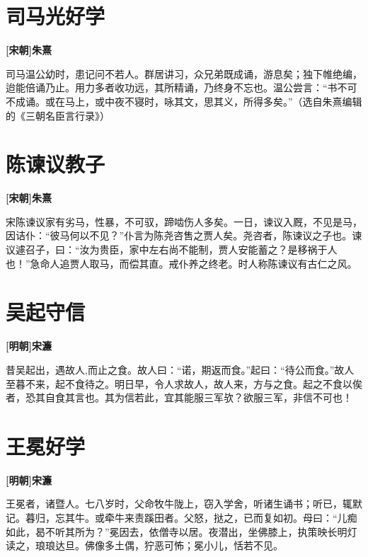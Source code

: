 \documentclass[UTF8,titlepage,oneside]{ctexbook}
\begin{document}
\chapter*{司马光好学}
\begin{center}
	\textbf{[宋朝]朱熹}
\end{center}


司马温公幼时，患记问不若人。群居讲习，众兄弟既成诵，游息矣；独下帷绝编，迨能倍诵乃止。用力多者收功远，其所精诵，乃终身不忘也。温公尝言：“书不可不成诵。或在马上，或中夜不寝时，咏其文，思其义，所得多矣。”（选自朱熹编辑的《三朝名臣言行录》）

\chapter*{陈谏议教子}
\begin{center}
	\textbf{[宋朝]朱熹}
\end{center}


宋陈谏议家有劣马，性暴，不可驭，蹄啮伤人多矣。一日，谏议入厩，不见是马，因诘仆：“彼马何以不见？”仆言为陈尧咨售之贾人矣。尧咨者，陈谏议之子也。谏议遽召子，曰：“汝为贵臣，家中左右尚不能制，贾人安能蓄之？是移祸于人也！”急命人追贾人取马，而偿其直。戒仆养之终老。时人称陈谏议有古仁之风。

\chapter*{吴起守信}
\begin{center}
	\textbf{[明朝]宋濂}
\end{center}


昔吴起出，遇故人,而止之食。故人曰：“诺，期返而食。”起曰：“待公而食。”故人至暮不来，起不食待之。明日早，令人求故人，故人来，方与之食。起之不食以俟者，恐其自食其言也。其为信若此，宜其能服三军欤？欲服三军，非信不可也！

\chapter*{王冕好学}
\begin{center}
	\textbf{[明朝]宋濂}
\end{center}


王冕者，诸暨人。七八岁时，父命牧牛陇上，窃入学舍，听诸生诵书；听已，辄默记。暮归，忘其牛。或牵牛来责蹊田者。父怒，挞之，已而复如初。母曰：“儿痴如此，曷不听其所为？”冕因去，依僧寺以居。夜潜出，坐佛膝上，执策映长明灯读之，琅琅达旦。佛像多土偶，狞恶可怖；冕小儿，恬若不见。
\end{document}
